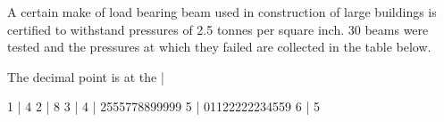 \documentclass[addpoints]{examsetup}
\begin{document}
\begin{questions}

\pagebreak













\question

A certain make of load bearing beam used in construction of large buildings is certified to withstand pressures of 2.5 tonnes per square inch.
30 beams were tested and the pressures at which they failed are collected in the table below.

\begin{Schunk}
\begin{Soutput}
  The decimal point is at the |

  1 | 4
  2 | 8
  3 | 
  4 | 2555778899999
  5 | 01122222234559
  6 | 5
\end{Soutput}
\end{Schunk}


\end{questions}
\end{document}
